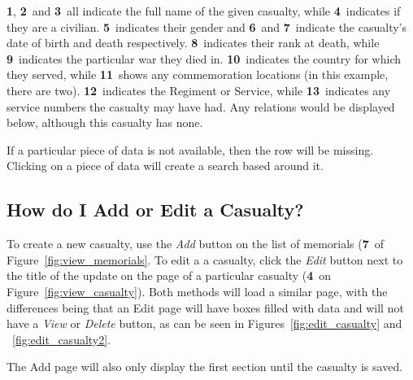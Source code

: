 \documentclass[12pt]{article}
\newcommand{\marker}[1]{\color{red}\textbf{#1}\color{black}}
\begin{document}
\marker{1}, \marker{2}\ and \marker{3}\ all indicate the full name of the given casualty, while \marker{4}\ indicates if they are a civilian. \marker{5}\ indicates their gender and \marker{6}\ and \marker{7}\ indicate the casualty's date of birth and death respectively. \marker{8}\ indicates their rank at death, while \marker{9}\ indicates the particular war they died in. \marker{10}\ indicates the country for which they served, while \marker{11}\ shows any commemoration locations (in this example, there are two). \marker{12}\ indicates the Regiment or Service, while \marker{13}\ indicates any service numbers the casualty may have had. Any relations would be displayed below, although this casualty has none.

\begin{infoBox}
If a particular piece of data is not available, then the row will be missing.\\
Clicking on a piece of data will create a search based around it.
\end{infoBox}

\newpage
\FloatBarrier
\subsection{How do I Add or Edit a Casualty?}\label{ssec:edit_casualty}
To create a new casualty, use the \textit{Add} button on the list of memorials (\marker{7}\ of Figure~\ref{fig:view_memorials}. To edit a a casualty, click the \textit{Edit} button next to the title of the update on the page of a particular casualty (\marker{4}\ on Figure~\ref{fig:view_casualty}). Both methods will load a similar page, with the differences being that an Edit page will have boxes filled with data and will not have a \textit{View} or \textit{Delete} button, as can be seen in Figures~\ref{fig:edit_casualty} and ~\ref{fig:edit_casualty2}.
\begin{infoBox}
The Add page will also only display the first section until the casualty is saved.
\end{infoBox}
\end{document}
